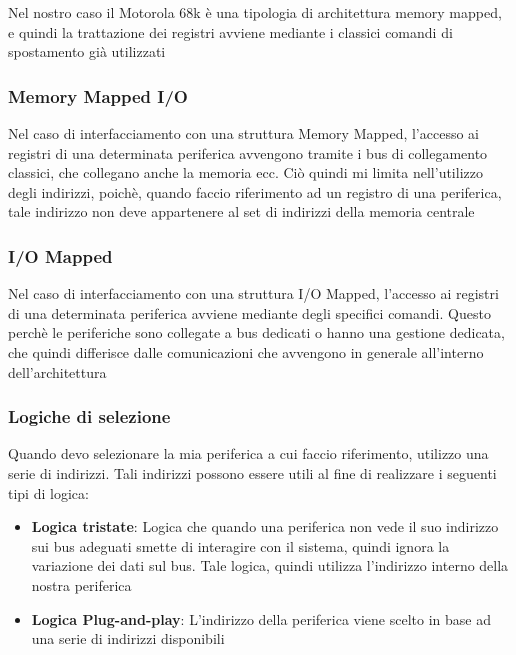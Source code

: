 Nel nostro caso il Motorola 68k è una tipologia di architettura memory mapped, e quindi la trattazione dei registri avviene mediante i classici comandi di spostamento già utilizzati

\subsubsection{Memory Mapped I/O}
Nel caso di interfacciamento con una struttura Memory Mapped, l'accesso ai registri di una determinata periferica avvengono tramite i bus di collegamento classici, che collegano anche la memoria ecc. Ciò quindi mi limita nell'utilizzo degli indirizzi, poichè, quando faccio riferimento ad un registro di una periferica, tale indirizzo non deve appartenere al set di indirizzi della memoria centrale

\subsubsection{I/O Mapped}
Nel caso di interfacciamento con una struttura I/O Mapped, l'accesso ai registri di una determinata periferica avviene mediante degli specifici comandi. Questo perchè le periferiche sono collegate a bus dedicati o hanno una gestione dedicata, che quindi differisce dalle comunicazioni che avvengono in generale all'interno dell'architettura

\subsubsection{Logiche di selezione}
Quando devo selezionare la mia periferica a cui faccio riferimento, utilizzo una serie di indirizzi. Tali indirizzi possono essere utili al fine di realizzare i seguenti tipi di logica:
\begin{itemize}
    \item \textbf{Logica tristate}: Logica che quando una periferica non vede il suo indirizzo sui bus adeguati smette di interagire con il sistema, quindi ignora la variazione dei dati sul bus. Tale logica, quindi utilizza l'indirizzo interno della nostra periferica
    \item \textbf{Logica Plug-and-play}: L'indirizzo della periferica viene scelto in base ad una serie di indirizzi disponibili
\end{itemize}

